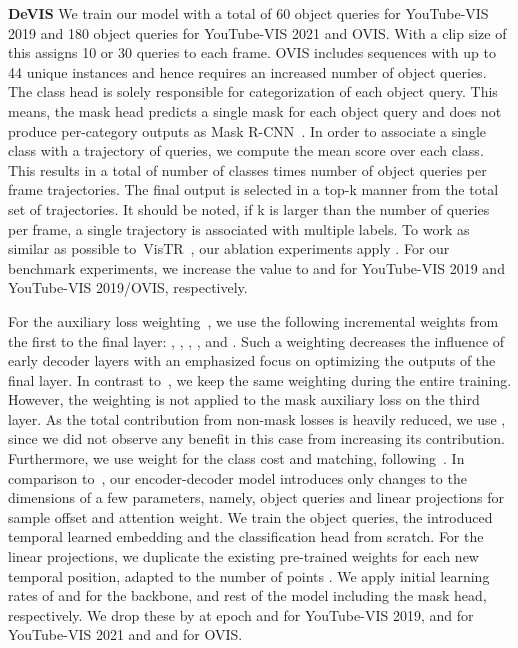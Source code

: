 \documentclass[runningheads]{llncs}
\newcommand{\vistr}{\mbox{VisTR}}
\newcommand{\evis}{\mbox{DeVIS}}
\begin{document}
\noindent \textbf{\evis{}}
We train our model with a total of 60 object queries for YouTube-VIS 2019 and 180 object queries for YouTube-VIS 2021 and OVIS.
With a clip size of  this assigns 10 or 30 queries to each frame.
OVIS includes sequences with up to 44 unique instances and hence requires an increased number of object queries.
The class head is solely responsible for categorization of each object query.
This means, the mask head predicts a single mask for each object query and does not produce per-category outputs as Mask R-CNN~\cite{he2017mask}.
In order to associate a single class with a trajectory of queries, we compute the mean score over each class.
This results in a total of number of classes times number of object queries per frame trajectories.
The final output is selected in a top-k manner from the total set of trajectories.
It should be noted, if k is larger than the number of queries per frame, a single trajectory is associated with multiple labels.
To work as similar as possible to~\vistr{}~\cite{vistr}, our ablation experiments apply .
For our benchmark experiments, we increase the value to  and  for YouTube-VIS 2019 and YouTube-VIS 2019/OVIS, respectively.

For the auxiliary loss weighting~\cite{AuxLoss}, we use the following incremental weights from the first to the final layer: , , , ,  and .
Such a weighting decreases the influence of early decoder layers with an emphasized focus on optimizing the outputs of the final layer.
In contrast to~\cite{AuxLoss}, we keep the same weighting during the entire training.
However, the weighting is not applied to the mask auxiliary loss on the third layer.
As the total contribution from non-mask losses is heavily reduced, we use , since we did not observe any benefit in this case from increasing its contribution.  
Furthermore, we use  weight for the class cost and matching, following~\cite{vistr}. 
In comparison to~\cite{deformable_detr}, our encoder-decoder model introduces only changes to the dimensions of a few parameters, namely, object queries and linear projections for sample offset and attention weight.
We train the object queries, the introduced temporal learned embedding and the classification head from scratch. 
For the linear projections, we duplicate the existing pre-trained weights for each new temporal position, adapted to the number of points . 
We apply initial learning rates of  and  for the backbone, and rest of the model including the mask head, respectively. 
We drop these by  at epoch  and  for YouTube-VIS 2019,  and  for YouTube-VIS 2021 and  and  for OVIS.
\end{document}
